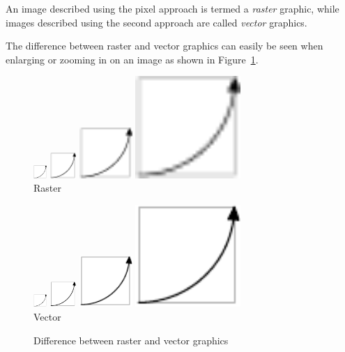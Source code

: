 \documentclass[a5paper, 10pt]{article}
\begin{document}
An image described using the pixel approach is termed a \emph{raster}
graphic, while images described using the second approach are called
\emph{vector} graphics.

The difference between raster and vector graphics can easily be seen
when enlarging or zooming in on an image as shown in
Figure~\ref{fig:rastervector}.

\begin{figure}[htbp]
  \centering
  \begin{minipage}{0.4\linewidth}
    \centering
    \includegraphics[width=0.5cm]{rasdemo}    
    \includegraphics[width=1cm]{rasdemo}
    \includegraphics[width=2cm]{rasdemo}
    \includegraphics[width=4cm]{rasdemo}\\
    Raster
  \end{minipage}
  \begin{minipage}{0.4\linewidth}
    \centering
    \includegraphics[width=0.5cm]{vecdemo}
    \includegraphics[width=1cm]{vecdemo}
    \includegraphics[width=2cm]{vecdemo}
    \includegraphics[width=4cm]{vecdemo}\\
    Vector
  \end{minipage}  
  \caption{Difference between raster and vector graphics}
  \label{fig:rastervector}
\end{figure}
\end{document}
